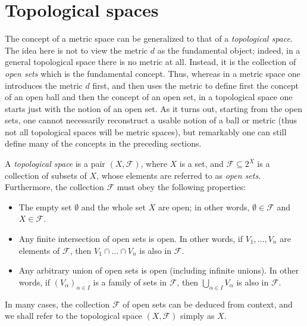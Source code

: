 \section{Topological spaces}\label{ii:sec:2.5}

\begin{note}
  The concept of a metric space can be generalized to that of a \emph{topological space}.
  The idea here is not to view the metric \(d\) as the fundamental object;
  indeed, in a general topological space there is no metric at all.
  Instead, it is the collection of \emph{open sets} which is the fundamental concept.
  Thus, whereas in a metric space one introduces the metric \(d\) first, and then uses the metric to define first the concept of an open ball and then the concept of an open set, in a topological space one starts just with the notion of an open set.
  As it turns out, starting from the open sets, one cannot necessarily reconstruct a usable notion of a ball or metric (thus not all topological spaces will be metric spaces), but remarkably one can still define many of the concepts in the preceding sections.
\end{note}

\begin{defn}\label{ii:2.5.1}
  A \emph{topological space} is a pair \((X, \mathcal{F})\), where \(X\) is a set, and \(\mathcal{F} \subseteq 2^X\) is a collection of subsets of \(X\), whose elements are referred to as \emph{open sets}.
  Furthermore, the collection \(\mathcal{F}\) must obey the following properties:
  \begin{itemize}
    \item The empty set \(\emptyset\) and the whole set \(X\) are open;
          in other words, \(\emptyset \in \mathcal{F}\) and \(X \in \mathcal{F}\).
    \item Any finite intersection of open sets is open.
          In other words, if \(V_1 , \dots, V_n\) are elements of \(\mathcal{F}\), then \(V_1 \cap \dots \cap V_n\) is also in \(\mathcal{F}\).
    \item Any arbitrary union of open sets is open (including infinite unions).
          In other words, if \((V_\alpha)_{\alpha \in I}\) is a family of sets in \(\mathcal{F}\), then \(\bigcup_{\alpha \in I} V_\alpha\) is also in \(\mathcal{F}\).
  \end{itemize}
\end{defn}

\begin{note}
  In many cases, the collection \(\mathcal{F}\) of open sets can be deduced from context, and we shall refer to the topological space \((X, \mathcal{F})\) simply as \(X\).
\end{note}

